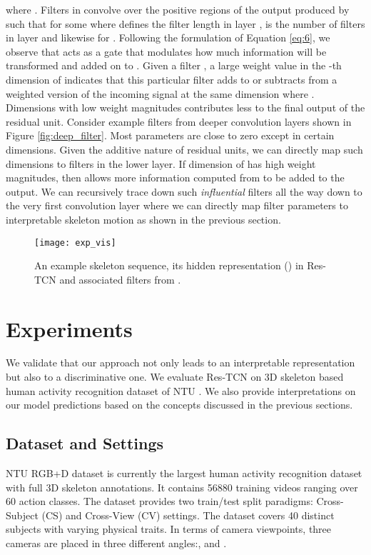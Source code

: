 \documentclass[10pt,twocolumn,letterpaper]{article}
\begin{document}
where . Filters in  convolve over the positive regions of the output produced by   such that  for some  where  defines the filter length in layer ,  is the number of filters in layer  and likewise for . Following the formulation of Equation \ref{eq:6}, we observe that  acts as a gate that modulates how much information will be transformed and added on to . Given a filter , a large weight value in the -th dimension of  indicates that this particular filter adds to or subtracts from  a weighted version of the incoming signal at the same dimension  where . Dimensions with low weight magnitudes contributes less to the final output of the residual unit. Consider example filters from deeper convolution layers shown in Figure \ref{fig:deep_filter}. Most parameters are close to zero except in certain dimensions. Given the additive nature of residual units, we can directly map such dimensions to filters in the lower layer. If dimension  of  has high weight magnitudes, then  allows more information computed from  to be added to the output. We can recursively trace down such \textit{influential} filters all the way down to the very first convolution layer where we can directly map filter parameters to interpretable skeleton motion as shown in the previous section. 


\begin{figure*}
\begin{center}
 \texttt{[image: exp\_vis]}
\end{center}
 \caption{An example skeleton sequence, its hidden representation () in Res-TCN and associated filters from .}
\label{fig:exp_vis}
\end{figure*}

\section{Experiments}
We validate that our approach not only leads to an interpretable representation but also to a discriminative one. We evaluate Res-TCN on 3D skeleton based human activity recognition dataset of NTU \cite{nturgdb2016}. We also provide interpretations on our model predictions based on the concepts discussed in the previous sections.

\subsection{Dataset and Settings}
NTU RGB+D dataset \cite{nturgdb2016} is currently the largest human activity recognition dataset with full 3D skeleton annotations. It contains 56880 training videos ranging over 60 action classes. The dataset provides two train/test split paradigms: Cross-Subject (CS) and Cross-View (CV) settings. The dataset covers 40 distinct subjects with varying physical traits. In terms of camera viewpoints, three cameras are placed in three different angles:,  and .
\end{document}
